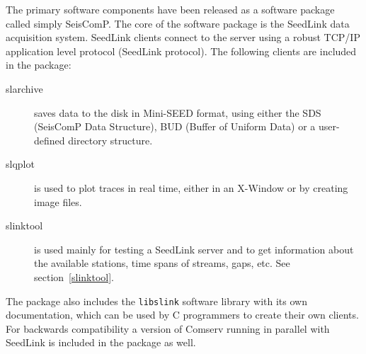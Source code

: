 \documentclass[11pt,a4paper,titlepage]{article}
\begin{document}
The primary software components have been released as a software
package called simply SeisComP. The core of the software package is
the SeedLink data acquisition system. SeedLink clients connect to the
server using a robust TCP/IP application level protocol (SeedLink
protocol). The following clients are included in the package:
\begin{description}
\item[slarchive] saves data to the disk in Mini-SEED format, using
either the SDS (SeisComP Data Structure), BUD (Buffer of Uniform Data)
or a user-defined directory structure.

\item[slqplot] is used to plot traces in real time, either in an
X-Window or by creating image files.

\item[slinktool] is used mainly for testing a SeedLink server and to
get information about the available stations, time spans of streams,
gaps, etc. See section~\ref{slinktool}.
\end{description}

The package also includes the \verb+libslink+ software library with
its own documentation, which can be used by C programmers to create
their own clients. For backwards compatibility a version of Comserv
running in parallel with SeedLink is included in the package as well.
\end{document}

